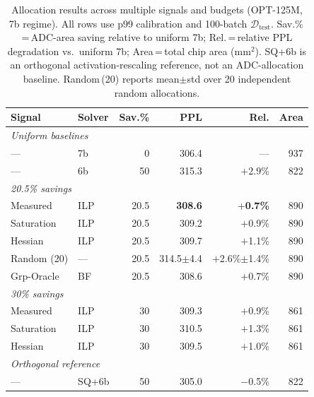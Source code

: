 \documentclass[sigconf,review,anonymous]{acmart}
\begin{document}
\begin{table}[t]
\centering
\caption{Allocation results across multiple signals and budgets (OPT-125M, 7b regime). All rows use p99 calibration and 100-batch $\mathcal{D}_\text{test}$. Sav.\%\,=\,ADC-area saving relative to uniform 7b; Rel.\,=\,relative PPL degradation vs.\ uniform 7b; Area\,=\,total chip area (mm$^2$). SQ+6b is an orthogonal activation-rescaling reference, not an ADC-allocation baseline. Random\,(20) reports mean$\pm$std over 20 independent random allocations.}
\label{tab:mixed_results}
\small
\begin{tabular}{llrrrr}
\toprule
Signal & Solver & Sav.\% & PPL & Rel. & Area \\
\midrule
\multicolumn{2}{l}{\emph{Uniform baselines}} \\
--- & 7b & 0 & 306.4 & --- & 937 \\
--- & 6b & 50 & 315.3 & $+$2.9\% & 822 \\
\midrule
\multicolumn{2}{l}{\emph{20.5\% savings}} \\
Measured & ILP & 20.5 & \textbf{308.6} & \textbf{$+$0.7\%} & 890 \\
Saturation & ILP & 20.5 & 309.2 & $+$0.9\% & 890 \\
Hessian & ILP & 20.5 & 309.7 & $+$1.1\% & 890 \\
Random (20) & --- & 20.5 & 314.5$\pm$4.4 & $+$2.6\%$\pm$1.4\% & 890 \\
Grp-Oracle & BF & 20.5 & 308.6 & $+$0.7\% & 890 \\
\midrule
\multicolumn{2}{l}{\emph{30\% savings}} \\
Measured & ILP & 30 & 309.3 & $+$0.9\% & 861 \\
Saturation & ILP & 30 & 310.5 & $+$1.3\% & 861 \\
Hessian & ILP & 30 & 309.5 & $+$1.0\% & 861 \\
\midrule
\multicolumn{2}{l}{\emph{Orthogonal reference}} \\
--- & SQ+6b & 50 & 305.0 & $-$0.5\% & 822 \\
\bottomrule
\end{tabular}
\end{table}
\end{document}
